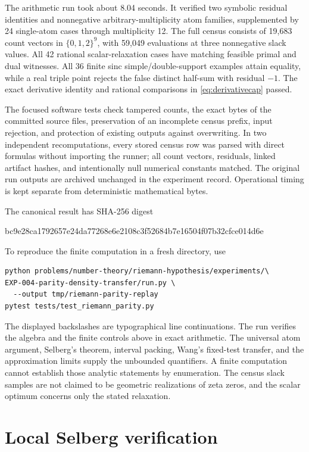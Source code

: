 \documentclass[11pt]{article}
\theoremstyle{remark}
\begin{document}
The arithmetic run took about 8.04 seconds. It verified two symbolic
residual identities and
nonnegative arbitrary-multiplicity atom families, supplemented by 24
single-atom cases through multiplicity 12. The full census consists of
19,683 count vectors in $\{0,1,2\}^9$, with 59,049 evaluations at three
nonnegative slack values. All 42 rational scalar-relaxation cases have
matching feasible primal and dual witnesses. All 36 finite sinc
simple/double-support examples attain equality, while a real triple point
rejects the false distinct half-sum with residual $-1$. The exact derivative
identity and rational comparisons in \eqref{eq:derivativecap} passed.

The focused software tests check tampered counts, the exact bytes of the
committed source files, preservation of an incomplete census prefix, input
rejection, and protection of existing outputs against overwriting.
In two independent recomputations, every stored census row was parsed
with direct formulas without importing the runner; all count vectors,
residuals, linked artifact hashes, and intentionally null numerical
constants matched. The original run outputs are archived unchanged in the
experiment record. Operational timing is kept separate from deterministic
mathematical bytes.

The canonical result has SHA-256 digest
\begin{center}\small\ttfamily
bc9e28ca1792657e24da77268e6e2108c3f52684b7e16504f07b32cfce014d6e
\end{center}
To reproduce the finite computation in a fresh directory, use
\begin{verbatim}
python problems/number-theory/riemann-hypothesis/experiments/\
EXP-004-parity-density-transfer/run.py \
  --output tmp/riemann-parity-replay
pytest tests/test_riemann_parity.py
\end{verbatim}
The displayed backslashes are typographical line continuations. The run
verifies the algebra and the finite controls above in exact arithmetic. The
universal atom argument, Selberg's theorem, interval packing, Wang's
fixed-test transfer, and the approximation limits supply the unbounded
quantifiers. A finite computation cannot establish those analytic
statements by enumeration.
The census slack samples are not claimed to be geometric realizations of
zeta zeros, and the scalar optimum concerns only the stated relaxation.

\section{Local Selberg verification}
\end{document}
